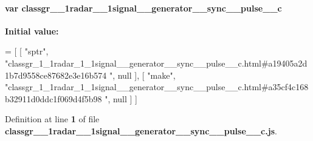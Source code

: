 \paragraph[{classgr\+\_\+1\+\_\+1radar\+\_\+1\+\_\+1signal\+\_\+\+\_\+generator\+\_\+\+\_\+sync\+\_\+\+\_\+pulse\+\_\+\+\_\+c}]{\setlength{\rightskip}{0pt plus 5cm}var classgr\+\_\+\_\+1radar\+\_\+\_\+1signal\+\_\+\+\_\+generator\+\_\+\+\_\+sync\+\_\+\+\_\+pulse\+\_\+\+\_\+c}\label{classgr__1__1radar__1__1signal____generator____sync____pulse____c_8js_a6f870bff1e14751b0a92b1fb3491cca9}
{\bfseries Initial value\+:}
\begin{DoxyCode}
=
[
    [ \textcolor{stringliteral}{"sptr"}, \textcolor{stringliteral}{"classgr\_1\_1radar\_1\_1signal\_\_generator\_\_sync\_\_pulse\_\_c.html#a19405a2d1b7d9558ce87682e3e16b574
      "}, null ],
    [ \textcolor{stringliteral}{"make"}, \textcolor{stringliteral}{"classgr\_1\_1radar\_1\_1signal\_\_generator\_\_sync\_\_pulse\_\_c.html#a35cf4c168b32911d0ddc1f069d4f5b98
      "}, null ]
]
\end{DoxyCode}


Definition at line {\bf 1} of file {\bf classgr\+\_\+\_\+1radar\+\_\+\_\+1signal\+\_\+\+\_\+generator\+\_\+\+\_\+sync\+\_\+\+\_\+pulse\+\_\+\+\_\+c.\+js}.

